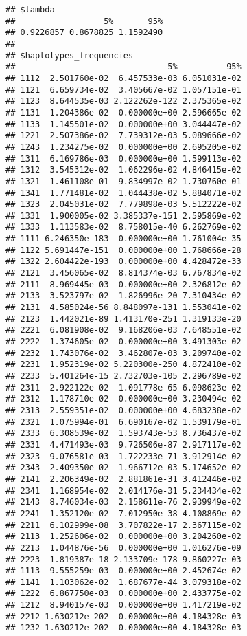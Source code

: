 \documentclass[
]{article}
\begin{document}
\begin{verbatim}
## $lambda
##                  5%       95% 
## 0.9226857 0.8678825 1.1592490 
## 
## $haplotypes_frequencies
##                               5%          95%
## 1112  2.501760e-02  6.457533e-03 6.051031e-02
## 1121  6.659734e-02  3.405667e-02 1.057151e-01
## 1123  8.644535e-03 2.122262e-122 2.375365e-02
## 1131  1.204386e-02  0.000000e+00 2.596665e-02
## 1133  1.145501e-02  0.000000e+00 3.044447e-02
## 1221  2.507386e-02  7.739312e-03 5.089666e-02
## 1243  1.234275e-02  0.000000e+00 2.695205e-02
## 1311  6.169786e-03  0.000000e+00 1.599113e-02
## 1312  3.545312e-02  1.062296e-02 4.846415e-02
## 1321  1.461108e-01  9.834997e-02 1.730760e-01
## 1341  1.771481e-02  1.044438e-02 5.884071e-02
## 1323  2.045031e-02  7.779898e-03 5.512222e-02
## 1331  1.900005e-02 3.385337e-151 2.595869e-02
## 1333  1.113583e-02  8.758015e-40 6.262769e-02
## 1111 6.246350e-183  0.000000e+00 1.761004e-35
## 1122 5.691447e-151  0.000000e+00 1.768666e-28
## 1322 2.604422e-193  0.000000e+00 4.428472e-33
## 2121  3.456065e-02  8.814374e-03 6.767834e-02
## 2111  8.969445e-03  0.000000e+00 2.326812e-02
## 2133  3.523797e-02  1.826996e-20 7.310434e-02
## 2131  4.585024e-56 8.848097e-131 1.553041e-02
## 2123  1.442021e-89 1.413170e-251 1.319133e-20
## 2221  6.081908e-02  9.168206e-03 7.648551e-02
## 2222  1.374605e-02  0.000000e+00 3.491303e-02
## 2232  1.743076e-02  3.462807e-03 3.209740e-02
## 2231  1.952319e-02 5.220300e-250 4.872410e-02
## 2233  5.401264e-15 2.732703e-105 2.296789e-02
## 2311  2.922122e-02  1.091778e-65 6.098623e-02
## 2312  1.178710e-02  0.000000e+00 3.230494e-02
## 2313  2.559351e-02  0.000000e+00 4.683238e-02
## 2321  1.075994e-01  6.690167e-02 1.539179e-01
## 2333  6.308539e-02  1.593743e-53 8.736437e-02
## 2331  4.471493e-03  9.726506e-87 2.917117e-02
## 2323  9.076581e-03  1.722233e-71 3.912914e-02
## 2343  2.409350e-02  1.966712e-03 5.174652e-02
## 2141  2.206349e-02  2.881861e-31 3.412446e-02
## 2341  1.168954e-02  2.014176e-31 5.234434e-02
## 2143  8.746034e-03  2.158611e-76 2.939949e-02
## 2241  1.352120e-02  7.012950e-38 4.108869e-02
## 2211  6.102999e-08  3.707822e-17 2.367115e-02
## 2113  1.252606e-02  0.000000e+00 3.204260e-02
## 2213  1.044876e-56  0.000000e+00 1.016276e-09
## 2223  1.819387e-18 2.133709e-178 9.860227e-03
## 1113  9.555259e-03  0.000000e+00 2.452674e-02
## 1141  1.103062e-02  1.687677e-44 3.079318e-02
## 1222  6.867750e-03  0.000000e+00 2.433775e-02
## 1212  8.940157e-03  0.000000e+00 1.417219e-02
## 2212 1.630212e-202  0.000000e+00 4.184328e-03
## 1232 1.630212e-202  0.000000e+00 4.184328e-03

\end{verbatim}
\end{document}
